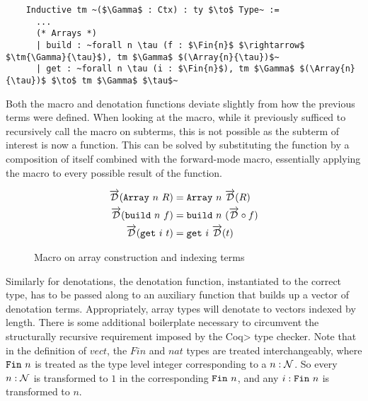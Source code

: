  \begin{verbatim}
    Inductive tm ~($\Gamma$ : Ctx) : ty $\to$ Type~ :=
      ...
      (* Arrays *)
      | build : ~forall n \tau (f : $\Fin{n}$ $\rightarrow$ $\tm{\Gamma}{\tau}$), tm $\Gamma$ $(\Array{n}{\tau})$~
      | get : ~forall n \tau (i : $\Fin{n}$), tm $\Gamma$ $(\Array{n}{\tau})$ $\to$ tm $\Gamma$ $\tau$~
  \end{verbatim}

  Both the macro and denotation functions deviate slightly from how the previous terms were defined.
  When looking at the macro, while it previously sufficed to recursively call the macro on subterms, this is not possible as the subterm of interest is now a function.
  This can be solved by substituting the function by a composition of itself combined with the forward-mode macro, essentially applying the macro to every possible result of the function.

  \begin{figure}
    \centering
    \begin{equation*}
      \begin{split}
        \overrightarrow{\mathcal{D}}(\texttt{Array}\ n\ R) &= \texttt{Array}\ n\ \overrightarrow{\mathcal{D}}(R) \\
        \overrightarrow{\mathcal{D}}(\texttt{build}\ n\ f) &= \texttt{build}\ n\ (\overrightarrow{\mathcal{D}} \circ f) \\
        \overrightarrow{\mathcal{D}}(\texttt{get}\ i\ t) &= \texttt{get}\ i\ \overrightarrow{\mathcal{D}}(t)
      \end{split}
    \end{equation*}
    \caption{Macro on array construction and indexing terms}
    \label{eqn:macro_array}
  \end{figure}

  Similarly for denotations, the denotation function, instantiated to the correct type, has to be passed along to an auxiliary function that builds up a vector of denotation terms.
  Appropriately, array types will denotate to vectors indexed by length.
  There is some additional boilerplate necessary to circumvent the structurally recursive requirement imposed by the \<Coq> type checker.
  Note that in the definition of $vect$, the $Fin$ and $nat$ types are treated interchangeably, where $\texttt{Fin}\ n$ is treated as the type level integer corresponding to a $n : \mathcal{N}$.
  So every $n : \mathcal{N}$ is transformed to $1$ in the corresponding $\texttt{Fin}\ n$, and any $i : \texttt{Fin}\ n$ is transformed to $n$.

